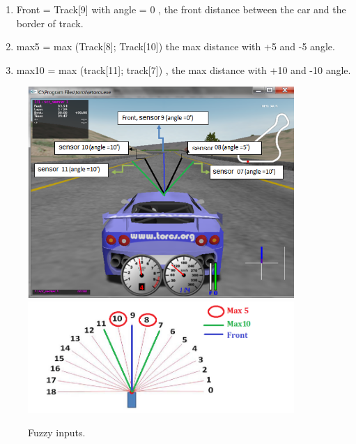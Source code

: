 \documentclass{llncs}
\begin{document}
\begin{enumerate}
	\item Front = Track[9]  with angle = 0 , the front distance between the car and the border of track.
	\item max5 = max (Track[8]; Track[10])
	the max distance with +5 and  -5 angle.
	\item max10 = max (track[11]; track[7]) ,	the max distance with +10 and  -10 angle.
\end{enumerate}
\begin{figure}[h!]
	
	\centering
	\includegraphics[width=0.9\textwidth]{fig/sensor22.png}
	\includegraphics[width=0.9\textwidth]{fig/front.png}
	\begin{minipage}{10cm}
		\centering
		\caption{\footnotesize Fuzzy inputs.}
		\label{fig34}
	\end{minipage} 		
\end{figure}
\newpage
\end{document}
